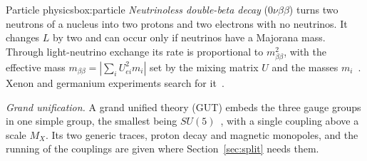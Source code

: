 \begin{primer}{Particle physics}{box:particle}
\emph{Neutrinoless double-beta decay} ($0\nu\beta\beta$) turns two neutrons of a nucleus into two protons and two electrons with no
neutrinos. It changes $L$ by two and can occur only if neutrinos have a Majorana mass. Through light-neutrino exchange its rate is
proportional to $m_{\beta\beta}^2$, with the effective mass $m_{\beta\beta}=|\sum_iU_{ei}^2m_i|$ set by the mixing matrix $U$ and the
masses $m_i$~\cite{navas2024}. Xenon and germanium experiments search for it~\cite{kamlandzen2025,legend2025}.

\emph{Grand unification.} A grand unified theory (GUT) embeds the three gauge groups in one simple group, the smallest being
$SU(5)$~\cite{georgiglashow}, with a single coupling above a scale $M_X$. Its two generic traces, proton decay and magnetic monopoles, and the
running of the couplings are given where Section~\ref{sec:split} needs them.
\end{primer}
